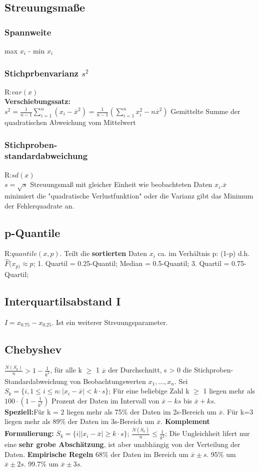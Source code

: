   \subsection{Streuungsmaße}
    \subsubsection{Spannweite}
    max $x_{i}$ - min $x_{i}$
    \subsubsection{Stichprbenvarianz $s^2$}
    R:$var(x)$\\
    \textbf{Verschiebungssatz:}\\
      $s^2 = \frac{1}{n-1} \sum_{i=1}^{n}(x_{i} - \overline{x}^2) = \frac{1}{n-1} (\sum_{i=1}^{n} x_{i}^2 - n\overline{x}^2)$
      Gemittelte Summe der quadratischen Abweichung vom Mittelwert
      \subsubsection{Stichproben-\\standardabweichung}
      R:$sd(x)$\\
      $s=\sqrt{s}$
      Streuungsmaß mit gleicher Einheit wie beobachteten Daten $x_{i}$.$ \overline{x}$ minimiert die "quadratische Verlustfunktion" oder die Varianz gibt das Minimum der Fehlerquadrate an.
      \subsection{p-Quantile}
      R:$quantile(x,p)$. Teilt die \textbf{sortierten} Daten $x_{i}$ ca. im Verhältnis p: (1-p) d.h. $\hat{F}(x_{p)} \approx p$;
      1. Quartil = 0.25-Quantil; 
      Median = 0.5-Quantil; 
      3. Quartil = 0.75-Quartil; 
      \subsection{Interquartilsabstand I}
      $I = x_{0.75} - x_{0.25}$. Ist ein weiterer Streuungsparameter.
      \subsection{Chebyshev}
      $\frac{N(S_{k})}{n} > 1-\frac{1}{k^2}$, für alle k $\geq$ 1
      $\overline{x}$ der Durchschnitt, s > 0 die Stichproben-Standardabweichung von Beobachtungswerten $x_{1}, ..., x_{n}$. Sei $S_{k} = \{i, 1 \leq i \leq n: |x_{i} - \overline{x}| < k \cdot s\}$; Für eine beliebige Zahl k $\geq$ 1 liegen mehr als $100 \cdot (1-\frac{1}{k^2})$ Prozent der Daten im Intervall von $\overline{x} - ks$ bis $ \overline{x} + ks$. \textbf{Speziell:}Für k = 2 liegen mehr als 75\% der Daten im 2s-Bereich um $\overline{x}$. Für k=3 liegen mehr als 89\% der Daten im 3s-Bereich um $\overline{x}$. \textbf{Komplement Formulierung:} $\overline{S}_{k} = \{i | |x_{i}-\overline{x}| \geq k \cdot s\}$; 
      $\frac{N(\overline{S}_{k})}{n} \leq \frac{1}{k^2}$; Die Ungleichheit lifert nur eine \textbf{sehr grobe Abschätzung}, ist aber unabhängig von der Verteilung der Daten. \textbf{Empirische Regeln} 68\% der Daten im Bereich um $\overline{x} \pm s$. 95\% um $\overline{x} \pm 2s$. 99.7\% um $\overline{x} \pm3s$.
